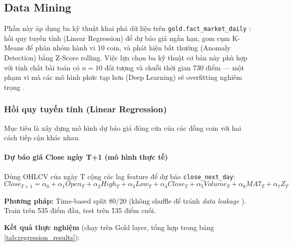 \subsection{Data Mining}

Phần này áp dụng ba kỹ thuật khai phá dữ liệu trên \texttt{gold.fact\_market\_daily} \cite{han2011}: hồi quy tuyến tính (Linear Regression) để dự báo giá ngắn hạn, gom cụm K-Means để phân nhóm hành vi 10 coin, và phát hiện bất thường (Anomaly Detection) bằng Z-Score rolling. Việc lựa chọn ba kỹ thuật cơ bản này phù hợp với tính chất bài toán có $n=10$ đối tượng và chuỗi thời gian 730 điểm — một phạm vi mà các mô hình phức tạp hơn (Deep Learning) sẽ overfitting nghiêm trọng \cite{james2021}.

\subsubsection{Hồi quy tuyến tính (Linear Regression)}

Mục tiêu là xây dựng mô hình dự báo giá đóng cửa của các đồng coin với hai cách tiếp cận khác nhau.

\paragraph{Dự báo giá Close ngày T+1 (mô hình thực tế)}
Dùng OHLCV của ngày T cộng các lag feature để dự báo \texttt{close\_next\_day}:
\[
Close_{T+1} = \alpha_0 + \alpha_1 Open_T + \alpha_2 High_T + \alpha_3 Low_T + \alpha_4 Close_T + \alpha_5 Volume_T + \alpha_6 MA7_T + \alpha_7 Z_T
\]

\textbf{Phương pháp:} Time-based split 80/20 (không shuffle để tránh \emph{data leakage} \cite{james2021}). Train trên \~535 điểm đầu, test trên \~135 điểm cuối.

\textbf{Kết quả thực nghiệm} (chạy trên Gold layer, tổng hợp trong bảng \ref{tab:regression_results}):

